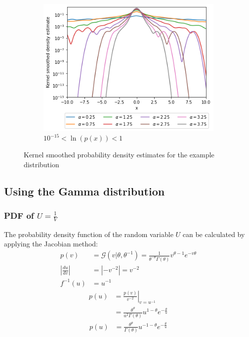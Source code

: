 \documentclass[a4paper]{article}
\begin{document}
\begin{figure}[h]
\begin{subfigure}[b]{0.3\textwidth}
    \end{subfigure}
    \hfill
    \begin{subfigure}[b]{0.3\textwidth}
        \centering
        \includegraphics[width=\textwidth]{figures/nonstandard_distribution_ksdensity_log_far.png}
        \caption{$10^{-15} < \ln(p(x)) < 1$}
        \label{fig:nonstandard_distribution_ksdensity_log_far}
    \end{subfigure}
    \caption{Kernel smoothed probability density estimates for the example distribution}
    \label{fig:nonstandard_distribution_kernel_smoothed}
\end{figure}


\subsection{Using the Gamma distribution}
\subsubsection{PDF of $U=\frac{1}{V}$}
The probability density function of the random variable $U$ can be calculated by applying the Jacobian method:
\begin{align*}
     p(v) &= \mathcal{G}(v | \theta, \theta^{-1})
    = \frac{1}{\theta^{-\theta} \Gamma (\theta)} v^{\theta - 1} e^{-v \theta} \\
    \left| \frac{du}{dv} \right| &= \left| -v^{-2} \right| = v^{-2} \\
    f^{-1} (u) &= u^{-1}
\end{align*}
\begin{align*}
    p(u) &= \left. \frac{p(v)}{v^{-2}} \right|_{v=u^{-1}} \\
    &= \frac{\theta^{\theta}}{u^2 \Gamma(\theta)} u^{1-\theta} e^{-\frac{\theta}{u}}
\end{align*}
\begin{align}\label{eq:pdf_of_u}
    p(u) &= \frac{\theta^{\theta}}{\Gamma(\theta)} u^{-1-\theta} e^{-\frac{\theta}{u}}
\end{align}
\end{document}
